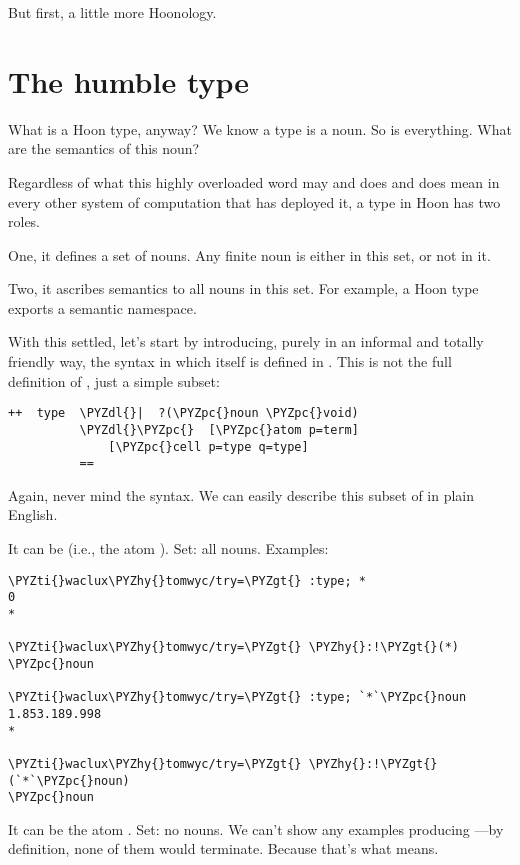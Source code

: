 But first, a little more Hoonology.

\section{The humble type}

What is a Hoon type, anyway?  We know a type is a noun.  So is 
everything.  What are the semantics of this noun?

Regardless of what this highly overloaded word may and does and
does mean in every other system of computation that has deployed
it, a type in Hoon has two roles.  

One, it defines a set of nouns.  Any finite noun is either in 
this set, or not in it.

Two, it ascribes semantics to all nouns in this set.  For
example, a Hoon type exports a semantic namespace.

With this settled, let's start by introducing, purely in an
informal and totally friendly way, the  syntax in which 
 itself is defined in .  This is
not the full definition of , just a simple subset:

\begin{framed_shaded}
\begin{Verbatim}[fontsize=\relsize{-2.5},fontseries=b,commandchars=\\\{\}]
++  type  \PYZdl{}|  ?(\PYZpc{}noun \PYZpc{}void)
          \PYZdl{}\PYZpc{}  [\PYZpc{}atom p=term]
              [\PYZpc{}cell p=type q=type]
          ==
\end{Verbatim}
\end{framed_shaded}
Again, never mind the syntax.  We can easily describe this subset
of  in plain English.

It can be  (i.e., the atom ).  Set:
all nouns.  Examples:

\begin{framed_shaded}
\begin{Verbatim}[fontsize=\relsize{-2.5},fontseries=b,commandchars=\\\{\}]
\PYZti{}waclux\PYZhy{}tomwyc/try=\PYZgt{} :type; *
0
*

\PYZti{}waclux\PYZhy{}tomwyc/try=\PYZgt{} \PYZhy{}:!\PYZgt{}(*)
\PYZpc{}noun

\PYZti{}waclux\PYZhy{}tomwyc/try=\PYZgt{} :type; `*`\PYZpc{}noun
1.853.189.998
*

\PYZti{}waclux\PYZhy{}tomwyc/try=\PYZgt{} \PYZhy{}:!\PYZgt{}(`*`\PYZpc{}noun)
\PYZpc{}noun
\end{Verbatim}
\end{framed_shaded}
It can be the atom .  Set: no nouns.  We can't show any
examples producing ---by definition, none of them would
terminate.  Because that's what  means.

